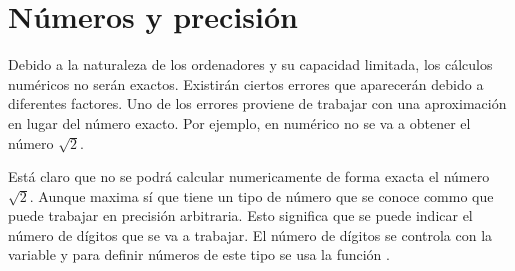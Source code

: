 
\section{Números y precisión}

Debido a la naturaleza de los ordenadores y su capacidad
limitada, los cálculos numéricos no serán exactos.
Existirán ciertos errores que aparecerán debido a diferentes
factores.
Uno de los errores proviene de trabajar con una aproximación
en lugar del número exacto.
Por ejemplo, en numérico no se va a obtener el número $\sqrt{2}$.



Está claro que no se podrá calcular numericamente de forma
exacta el número $\sqrt{2}$. Aunque maxima sí que tiene un
tipo de número que se conoce commo  que
puede trabajar en precisión arbitraria.
Esto significa que se puede indicar el número de dígitos
que se va a trabajar.
El número de dígitos se controla con la variable
 y para definir números de este tipo
se usa la función .


